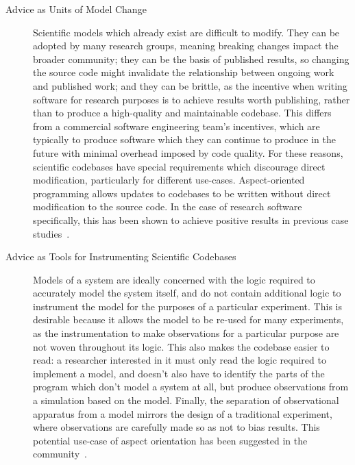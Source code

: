\begin{description}
  \item[Advice as Units of Model Change] Scientific models which already exist
    are difficult to modify. They can be adopted by many research groups,
    meaning breaking changes impact the broader community; they can be the basis
    of published results, so changing the source code might invalidate the
    relationship between ongoing work and published work; and they can be
    brittle, as the incentive when writing software for research purposes is to
    achieve results worth publishing, rather than to produce a high-quality and
    maintainable codebase. This differs from a commercial software engineering
    team's incentives, which are typically to produce software which they can
    continue to produce in the future with minimal overhead imposed by code
    quality. For these reasons, scientific codebases have special requirements
    which discourage direct modification, particularly for different use-cases.
    Aspect-oriented programming allows updates to codebases to be written
    without direct modification to the source code. In the case of research
    software specifically, this has been shown to achieve positive results in
    previous case studies~\cite{ionescu2009aspect}.

  \item[Advice as Tools for Instrumenting Scientific Codebases] Models of a
    system are ideally concerned with the logic required to accurately
    model the system itself, and do not contain additional logic to instrument the
    model for the purposes of a particular experiment. This is desirable because it
    allows the model to be re-used for many experiments, as the instrumentation to
    make observations for a particular purpose are not woven throughout its logic.
    This also makes the codebase easier to read: a researcher interested in it
    must only read the logic required to implement a model, and doesn't
    also have to identify the parts of the program which don't model a system at
    all, but produce observations from a simulation based on the model. Finally,
    the separation of observational apparatus from a model mirrors the design of
    a traditional experiment, where observations are carefully made so as not to
    bias results. This potential use-case of aspect orientation has been
    suggested in the community~\cite{gulyas1999use}.


\end{description}
